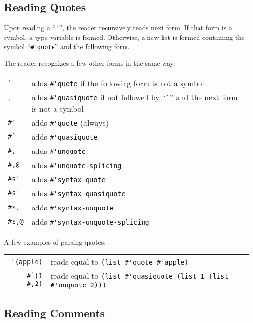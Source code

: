 \subsection{Reading Quotes}
\label{subsec:aml-base-lang-reader-quotes}

Upon reading a ``\lstinline!'!'', the reader recursively reads next form. If that form is a symbol, a type variable is formed. Otherwise, a new list is formed containing the symbol ``\lstinline!#'quote!'' and the following form. 

The reader recognizes a few other forms in the same way:

\begin{tabular}{ l l }
  \lstinline!'! & adds \lstinline!#'quote! if the following form is not a symbol \\
  \lstinline!`! & adds \lstinline!#'quasiquote! if not followed by ``\lstinline!`!'' and the next form is not a symbol \\
  \lstinline!#'! & adds \lstinline!#'quote! (always) \\
  \lstinline!#`! & adds \lstinline!#'quasiquote! \\
  \lstinline!#,! & adds \lstinline!#'unquote! \\
  \lstinline!#,@! & adds \lstinline!#'unquote-splicing! \\
  \lstinline!#s'! & adds \lstinline!#'syntax-quote! \\
  \lstinline!#s`! & adds \lstinline!#'syntax-quasiquote! \\
  \lstinline!#s,! & adds \lstinline!#'syntax-unquote! \\
  \lstinline!#s,@! & adds \lstinline!#'syntax-unquote-splicing! \\
\end{tabular}

\example A few examples of parsing quotes:

\begin{tabular}{ r l }
  \lstinline!'(apple)! & reads equal to \lstinline!(list #'quote #'apple)! \\
  \lstinline!#`(1 #,2)! & reads equal to \lstinline!(list #'quasiquote (list 1 (list #'unquote 2)))! \\
\end{tabular}





\subsection{Reading Comments}
\label{subsec:aml-base-lang-reader-comments}

